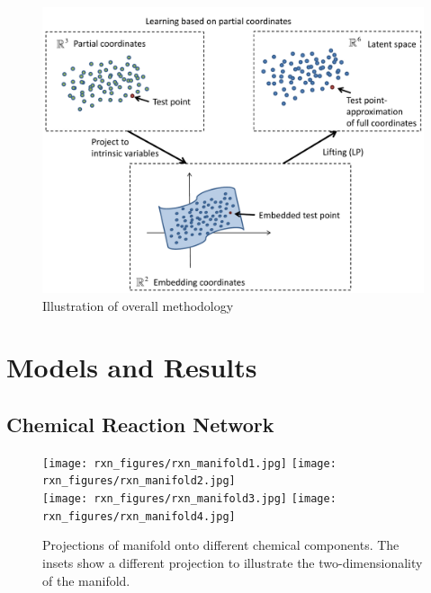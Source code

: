 \documentclass[12pt]{article}
\begin{document}
\begin{figure}[H]
\includegraphics[width=\textwidth]{LapPyr_illustration.pdf}
\caption{Illustration of overall methodology}
\end{figure}

\section{Models and Results}

\subsection{Chemical Reaction Network}

\begin{figure}[H]
  \texttt{[image: rxn\_figures/rxn\_manifold1.jpg]}
  \texttt{[image: rxn\_figures/rxn\_manifold2.jpg]} \\
  \texttt{[image: rxn\_figures/rxn\_manifold3.jpg]}
  \texttt{[image: rxn\_figures/rxn\_manifold4.jpg]} \\
    \caption{Projections of manifold onto different chemical components. The insets show a different projection to illustrate the two-dimensionality of the manifold.}
\end{figure}
\end{document}
